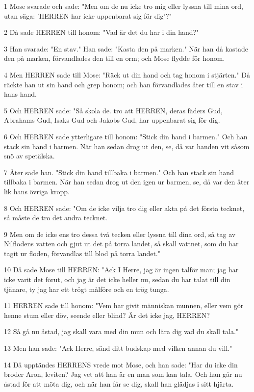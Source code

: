 \par 1 Mose svarade och sade: "Men om de nu icke tro mig eller lyssna till mina ord, utan säga: 'HERREN har icke uppenbarat sig för dig'?"
\par 2 Då sade HERREN till honom: "Vad är det du har i din hand?"
\par 3 Han svarade: "En stav." Han sade: "Kasta den på marken." När han då kastade den på marken, förvandlades den till en orm; och Mose flydde för honom.
\par 4 Men HERREN sade till Mose: "Räck ut din hand och tag honom i stjärten." Då räckte han ut sin hand och grep honom; och han förvandlades åter till en stav i hans hand.
\par 5 Och HERREN sade: "Så skola de. tro att HERREN, deras fäders Gud, Abrahams Gud, Isaks Gud och Jakobs Gud, har uppenbarat sig för dig.
\par 6 Och HERREN sade ytterligare till honom: "Stick din hand i barmen." Och han stack sin hand i barmen. När han sedan drog ut den, se, då var handen vit såsom snö av spetälska.
\par 7 Åter sade han. "Stick din hand tillbaka i barmen." Och han stack sin hand tillbaka i barmen. När han sedan drog ut den igen ur barmen, se, då var den åter lik hans övriga kropp.
\par 8 Och HERREN sade: "Om de icke vilja tro dig eller akta på det första tecknet, så måste de tro det andra tecknet.
\par 9 Men om de icke ens tro dessa två tecken eller lyssna till dina ord, så tag av Nilflodens vatten och gjut ut det på torra landet, så skall vattnet, som du har tagit ur floden, förvandlas till blod på torra landet."
\par 10 Då sade Mose till HERREN: "Ack I Herre, jag är ingen talför man; jag har icke varit det förut, och jag är det icke heller nu, sedan du har talat till din tjänare, ty jag har ett trögt målföre och en trög tunga.
\par 11 HERREN sade till honom: "Vem har givit människan munnen, eller vem gör henne stum eller döv, seende eller blind? Är det icke jag, HERREN?
\par 12 Så gå nu åstad, jag skall vara med din mun och lära dig vad du skall tala."
\par 13 Men han sade: "Ack Herre, sänd ditt budskap med vilken annan du vill."
\par 14 Då upptändes HERRENS vrede mot Mose, och han sade: "Har du icke din broder Aron, leviten? Jag vet att han är en man som kan tala. Och han går nu åstad för att möta dig, och när han får se dig, skall han glädjas i sitt hjärta.
